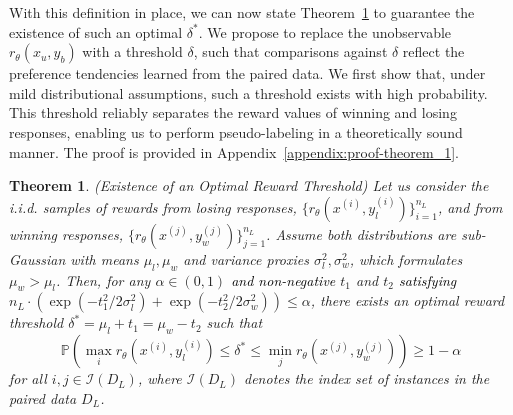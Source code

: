\documentclass{article} %
\newtheorem{theorem}{Theorem}
\newcommand\fix[1]{\textcolor{black}{#1}}
\newcommand\rebuttal[1]{\textcolor{black}{#1}}
\begin{document}
With this definition in place, we can now state Theorem~\ref{theorem_1} to guarantee the existence of such an optimal $\delta^*$. We propose to replace the unobservable $r_\theta(x_u, y_b)$ with a threshold $\delta$, such that comparisons against $\delta$ reflect the preference tendencies learned from the paired data. We first show that, under mild distributional assumptions, such a threshold exists with high probability. This threshold reliably separates the reward values of winning and losing responses, enabling us to perform pseudo-labeling in a theoretically sound manner. The proof is provided in Appendix~\ref{appendix:proof-theorem_1}.
\vspace{1mm}
\begin{theorem}{(Existence of an Optimal Reward Threshold)}
    \label{theorem_1}
    \textit{Let us consider the i.i.d. samples of rewards from losing responses, $\{ r_\theta(x^{(i)}, y_l^{(i)})\}_{i=1}^{n_L}$, and from winning responses, $\{ r_\theta(x^{(j)}, y_w^{(j)})\}_{j=1}^{n_L}$. Assume both distributions are sub-Gaussian with means \(\mu_l, \mu_w\) and variance proxies \(\sigma^2_l, \sigma^2_w\), which formulates \(\mu_w > \mu_l\). Then, for any \(\alpha \in (0,1)\) \fix{and non-negative} \(t_1\) and \(t_2\) \fix{satisfying} $n_L \cdot (\exp(-{t_1^2}/{2\sigma_l^2}) + \exp(-{t_2^2}/{2\sigma_w^2})) \leq \alpha$, there exists an optimal reward threshold \(\delta^* = \mu_l + t_1 = \mu_w - t_2\) such that
    \begin{equation}
    \label{eq:theorem_1}
        \mathbb{P}\left( \max_{i} r_\theta(x^{(i)}, y_l^{(i)}) \leq \delta^* \leq \min_{j} r_\theta(x^{(j)}, y_w^{(j)}) \right) \geq 1 - \alpha
    \end{equation}
    for all $i,j \in \mathcal{I}(D_L)$, where $\mathcal{I}(D_L)$ denotes the index set of instances in the paired data $D_L$.}
\end{theorem}
\vspace{1mm}

\end{document}
